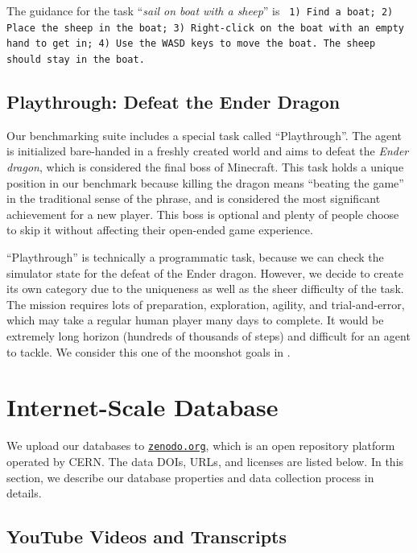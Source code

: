 The guidance for the task ``\textit{sail on boat with a sheep}'' is \texttt{
1) Find a boat;
2) Place the sheep in the boat;
3) Right-click on the boat with an empty hand to get in;
4) Use the WASD keys to move the boat. The sheep should stay in the boat.
}

\subsection{Playthrough: Defeat the Ender Dragon}

Our benchmarking suite includes a special task called ``Playthrough''. The agent is initialized bare-handed in a freshly created world and aims to defeat the \textit{Ender dragon}, which is considered the final boss of Minecraft.
This task holds a unique position in our benchmark because killing the dragon means ``beating the game'' in the traditional sense of the phrase, and is considered the most significant achievement for a new player. This boss is optional and plenty of people choose to skip it without affecting their open-ended game experience.

``Playthrough'' is technically a programmatic task, because we can check the simulator state for the defeat of the Ender dragon. However, we decide to create its own category due to the uniqueness as well as the sheer difficulty of the task. The mission requires lots of preparation, exploration, agility, and trial-and-error, which may take a regular human player many days to complete. It would be extremely long horizon (hundreds of thousands of steps) and difficult for an agent to tackle. We consider this one of the moonshot goals in \minedojo.  




\section{Internet-Scale Database}
\label{supp:sec:dataset}

We upload our databases to \texttt{\href{https://zenodo.org}{zenodo.org}}, which is an open repository platform operated by CERN. The data DOIs, URLs, and licenses are listed below. In this section, we describe our database properties and data collection process in details.



\subsection{YouTube Videos and Transcripts}
\label{supp:sec:dataset-youtube}


